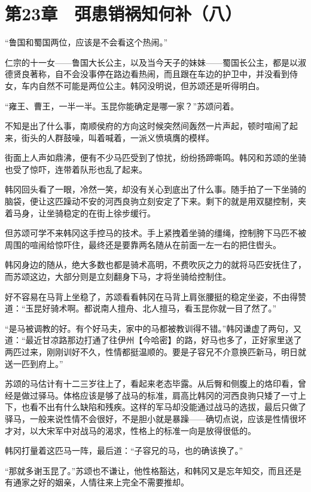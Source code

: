 \section{第23章　弭患销祸知何补（八）}

“鲁国和蜀国两位，应该是不会看这个热闹。”

仁宗的十一女——鲁国大长公主，以及当今天子的妹妹——蜀国长公主，都是以淑德贤良著称，自不会没事停在路边看热闹，而且跟在车边的护卫中，并没看到侍女，车内自然不可能是两位公主。韩冈没明说，但苏颂还是听得明白。

“雍王、曹王，一半一半。玉昆你能确定是哪一家？”苏颂问着。

不知是出了什么事，南顺侯府的方向这时候突然间轰然一片声起，顿时喧闹了起来，街头的人群鼓噪，叫着喊着，一派义愤填膺的模样。

街面上人声如鼎沸，便有不少马匹受到了惊扰，纷纷扬蹄嘶鸣。韩冈和苏颂的坐骑也受了惊吓，连带着队形也乱了起来。

韩冈回头看了一眼，冷然一笑，却没有关心到底出了什么事。随手拍了一下坐骑的脑袋，便让这匹躁动不安的河西良驹立刻安定了下来。剩下的就是用双腿控制，夹着马身，让坐骑稳定的在街上徐步缓行。

但苏颂可学不来韩冈这手控马的技术。手上紧拽着坐骑的缰绳，控制胯下马匹不被周围的喧闹给惊吓住，最终还是要靠两名随从在前面一左一右的把住辔头。

韩冈身边的随从，绝大多数也都是骑术高明，不费吹灰之力的就将马匹安抚住了，而苏颂这边，大部分则是立刻翻身下马，才将坐骑给控制住。

好不容易在马背上坐稳了，苏颂看看韩冈在马背上肩张腰挺的稳定坐姿，不由得赞道：“玉昆好骑术啊。都说南人擅舟、北人擅马，看玉昆你就一目了然了。”

“是马被调教的好。有个好马夫，家中的马都被教训得不错。”韩冈谦虚了两句，又道：“最近甘凉路那边打通了往伊州【今哈密】的路，好马也多了，正好家里送了两匹过来，刚刚训好不久，性情都挺温顺的。要是子容兄不介意换匹新马，明日就送一匹到府上。”

苏颂的马估计有十二三岁往上了，看起来老态毕露。从后臀和侧腹上的烙印看，曾经是做过驿马。体格应该是够了战马的标准，肩高比韩冈的河西良驹只矮了一寸上下，也看不出有什么缺陷和残疾。这样的军马却没能通过战马的选拔，最后只做了驿马，一般来说性情不会很好，不是胆小就是暴躁——确切点说，应该是性情很坏才对，以大宋军中对战马的渴求，性格上的标准一向是放得很低的。

韩冈打量着这匹马一阵，最后道：“子容兄的马，也的确该换了。”

“那就多谢玉昆了。”苏颂也不谦让，他性格豁达，和韩冈又是忘年知交，而且还是有通家之好的姻亲，人情往来上完全不需要推却。


